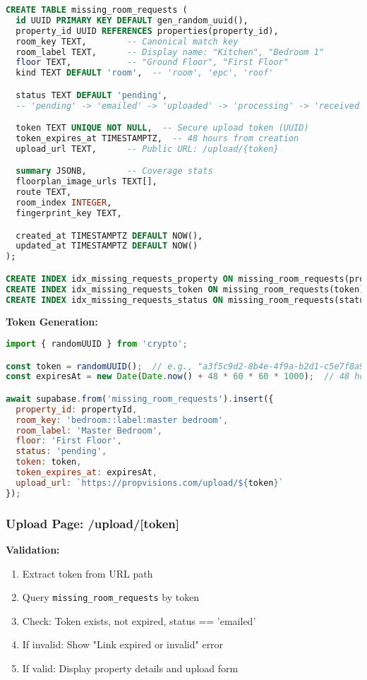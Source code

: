 \documentclass[11pt,a4paper]{article}
\begin{document}
\begin{lstlisting}[language=SQL, caption=missing\_room\_requests Schema]
CREATE TABLE missing_room_requests (
  id UUID PRIMARY KEY DEFAULT gen_random_uuid(),
  property_id UUID REFERENCES properties(property_id),
  room_key TEXT,        -- Canonical match key
  room_label TEXT,      -- Display name: "Kitchen", "Bedroom 1"
  floor TEXT,           -- "Ground Floor", "First Floor"
  kind TEXT DEFAULT 'room',  -- 'room', 'epc', 'roof'

  status TEXT DEFAULT 'pending',
  -- 'pending' -> 'emailed' -> 'uploaded' -> 'processing' -> 'received'

  token TEXT UNIQUE NOT NULL,  -- Secure upload token (UUID)
  token_expires_at TIMESTAMPTZ,  -- 48 hours from creation
  upload_url TEXT,      -- Public URL: /upload/{token}

  summary JSONB,        -- Coverage stats
  floorplan_image_urls TEXT[],
  route TEXT,
  room_index INTEGER,
  fingerprint_key TEXT,

  created_at TIMESTAMPTZ DEFAULT NOW(),
  updated_at TIMESTAMPTZ DEFAULT NOW()
);

CREATE INDEX idx_missing_requests_property ON missing_room_requests(property_id);
CREATE INDEX idx_missing_requests_token ON missing_room_requests(token);
CREATE INDEX idx_missing_requests_status ON missing_room_requests(status);
\end{lstlisting}

\textbf{Token Generation:}
\begin{lstlisting}[language=JavaScript, caption=Generate Upload Token]
import { randomUUID } from 'crypto';

const token = randomUUID();  // e.g., "a3f5c9d2-8b4e-4f9a-b2d1-c5e7f8a9b0c1"
const expiresAt = new Date(Date.now() + 48 * 60 * 60 * 1000);  // 48 hours

await supabase.from('missing_room_requests').insert({
  property_id: propertyId,
  room_key: 'bedroom::label:master bedroom',
  room_label: 'Master Bedroom',
  floor: 'First Floor',
  status: 'pending',
  token: token,
  token_expires_at: expiresAt,
  upload_url: `https://propvisions.com/upload/${token}`
});
\end{lstlisting}

\subsubsection{Upload Page: /upload/[token]}

\textbf{Validation:}
\begin{enumerate}
  \item Extract token from URL path
  \item Query \texttt{missing\_room\_requests} by token
  \item Check: Token exists, not expired, status == 'emailed'
  \item If invalid: Show "Link expired or invalid" error
  \item If valid: Display property details and upload form
\end{enumerate}
\end{document}
